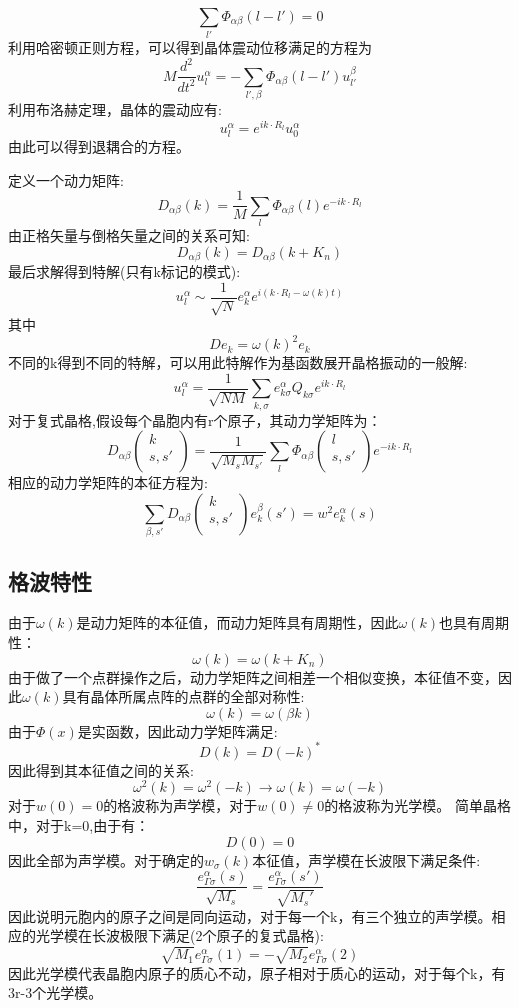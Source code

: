 \[\sum_{l'}\Phi_{\alpha\beta}(l-l')=0\]
利用哈密顿正则方程，可以得到晶体震动位移满足的方程为
\[M\frac{d^2}{dt^2}u_l^\alpha=-\sum_{l',\beta}\Phi_{\alpha\beta}(l-l')u_{l'}^\beta\]
利用布洛赫定理，晶体的震动应有:
\[u_l^\alpha=e^{ik\cdot R_l}u_0^\alpha\]
由此可以得到退耦合的方程。\par
定义一个动力矩阵:
\[D_{\alpha\beta}(k)=\frac{1}{M}\sum_{l}\Phi_{\alpha\beta}(l)e^{-ik\cdot R_l}\]
由正格矢量与倒格矢量之间的关系可知:
\[D_{\alpha\beta}(k)=D_{\alpha\beta}(k+K_n)\]
最后求解得到特解(只有k标记的模式):
\[u_l^\alpha\sim\frac{1}{\sqrt{N}}e_k^\alpha e^{i(k\cdot R_l-\omega(k) t)}\]
其中
\[De_k=\omega(k)^2 e_k\]
不同的k得到不同的特解，可以用此特解作为基函数展开晶格振动的一般解:
\[u_l^\alpha=\frac{1}{\sqrt{NM}}\sum_{k,\sigma}e^{\alpha}_{k\sigma}Q_{k\sigma}e^{ik\cdot R_l}\]
对于复式晶格,假设每个晶胞内有r个原子，其动力学矩阵为：
\begin{equation}
D_{\alpha\beta}\left(\begin{array}{c}k\\s,s'\\\end{array}\right)=\frac{1}{\sqrt{M_sM_{s'}}}\sum_{l}\Phi_{\alpha\beta}\left(\begin{array}{c}l\\s,s'\\\end{array}\right)e^{-ik\cdot R_l}
\end{equation}
相应的动力学矩阵的本征方程为:
\begin{equation}
\sum_{\beta,s'}D_{\alpha\beta}\left(\begin{array}{c}k\\s,s'\\\end{array}\right)e^\beta_k(s')=w^2e^\alpha_k(s)
\end{equation}

\subsection{格波特性}
由于$\omega(k)$是动力矩阵的本征值，而动力矩阵具有周期性，因此$\omega(k)$也具有周期性：
\[\omega(k)=\omega(k+K_n)\]
由于做了一个点群操作之后，动力学矩阵之间相差一个相似变换，本征值不变，因此$\omega(k)$具有晶体所属点阵的点群的全部对称性:
\[\omega(k)=\omega(\beta k)\]
由于$\Phi(x)$是实函数，因此动力学矩阵满足:
\[D(k)=D(-k)^*\]
因此得到其本征值之间的关系:
\[\omega^2(k)=\omega^2(-k)\rightarrow \omega(k)=\omega(-k)\]
对于$w(0)=0$的格波称为声学模，对于$w(0)\ne0$的格波称为光学模。
简单晶格中，对于k=0,由于有：
\[D(0)=0\]
因此全部为声学模。对于确定的$w_\sigma(k)$本征值，声学模在长波限下满足条件:
\[\frac{e_{\Gamma\sigma}^\alpha(s)}{\sqrt{M_s}}=\frac{e_{\Gamma\sigma}^\alpha(s')}{\sqrt{M_s'}}\]
因此说明元胞内的原子之间是同向运动，对于每一个k，有三个独立的声学模。相应的光学模在长波极限下满足(2个原子的复式晶格):
\[\sqrt{M_1}e_{\Gamma\sigma}^\alpha(1)=-\sqrt{M_2}e_{\Gamma\sigma}^\alpha(2)\]
因此光学模代表晶胞内原子的质心不动，原子相对于质心的运动，对于每个k，有3r-3个光学模。
